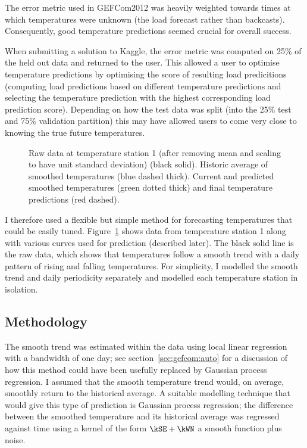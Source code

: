 The error metric used in GEFCom2012 was heavily weighted towards times at which temperatures were unknown (\ie the load forecast rather than backcasts).
Consequently, good temperature predictions seemed crucial for overall success.

When submitting a solution to Kaggle, the error metric was computed on 25\% of the held out data and returned to the user.
This allowed a user to optimise temperature predictions by optimising the score of resulting load predicitions (\ie computing load predictions based on different temperature predictions and selecting the temperature prediction with the highest corresponding load prediction score).
Depending on how the test data was split (into the 25\% test and 75\% validation partition) this may have allowed users to come very close to knowing the true future temperatures.

\begin{figure}[ht]
  \begin{center}
    
  \end{center}
  \caption[Modelling of temperature data.]{Raw data at temperature station 1 (after removing mean and scaling to have unit standard deviation) (black solid). Historic average of smoothed temperatures (blue dashed thick). Current and predicted smoothed temperatures (green dotted thick) and final temperature predictions (red dashed).}
  \label{fig:temp_pred}
\end{figure}

I therefore used a flexible but simple method for forecasting temperatures that could be easily tuned.
Figure~\ref{fig:temp_pred} shows data from temperature station 1 along with various curves used for prediction (described later).
The black solid line is the raw data, which shows that temperatures follow a smooth trend with a daily pattern of rising and falling temperatures.
For simplicity, I modelled the smooth trend and daily periodicity separately and modelled each temperature station in isolation.

\subsection{Methodology}

The smooth trend was estimated within the data using local linear regression \citep[e.g. chapter 6 of][]{Hastie2009-hj} with a bandwidth of one day; see section~\ref{sec:gefcom:auto} for a discussion of how this method could have been usefully replaced by Gaussian process regression.
I assumed that the smooth temperature trend would, on average, smoothly return to the historical average.
A suitable modelling technique that would give this type of prediction is Gaussian process regression; the difference between the smoothed temperature and its historical average was regressed against time using a kernel of the form $\kSE + \kWN$ \ie a smooth function plus noise.

